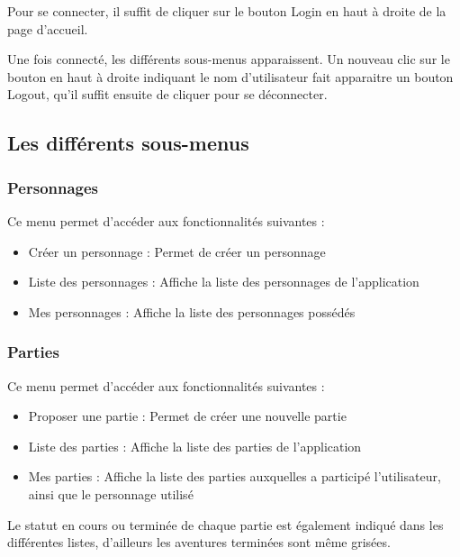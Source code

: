\documentclass[a4paper, 11pt, titlepage]{article}
\begin{document}
Pour se connecter, il suffit de cliquer sur le bouton Login en haut à droite de la page d'accueil.

Une fois connecté, les différents sous-menus apparaissent. Un nouveau clic sur le bouton en haut à droite indiquant le nom d'utilisateur fait apparaitre un bouton Logout, qu'il suffit ensuite de cliquer pour se déconnecter.


\subsection {Les différents sous-menus}

\subsubsection {Personnages}

Ce menu permet d'accéder aux fonctionnalités suivantes :

\begin{itemize}
\item
Créer un personnage : Permet de créer un personnage

\item
Liste des personnages : Affiche la liste des personnages de l'application

\item
Mes personnages : Affiche la liste des personnages possédés

\end{itemize}


\subsubsection {Parties}

Ce menu permet d'accéder aux fonctionnalités suivantes :

\begin{itemize}
\item
Proposer une partie : Permet de créer une nouvelle partie

\item
Liste des parties : Affiche la liste des parties de l'application

\item
Mes parties : Affiche la liste des parties auxquelles a participé l'utilisateur, ainsi que le personnage utilisé

\end{itemize}

Le statut en cours ou terminée de chaque partie est également indiqué dans les différentes listes, d'ailleurs les aventures terminées sont même grisées.
\end{document}
